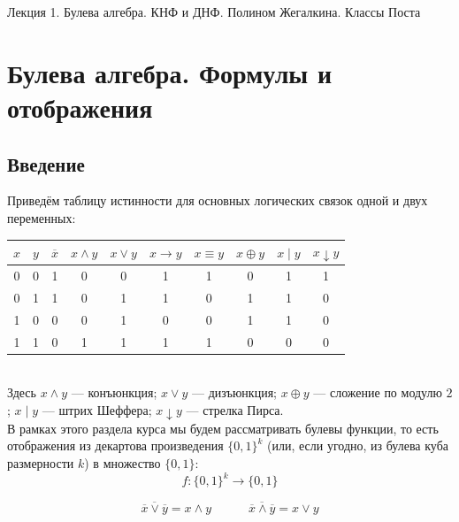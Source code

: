 \documentclass[11pt]{article}
\begin{document}
\begin{titlepage}
    \centering
    \vspace*{\fill}  %

    {\Huge Лекция 1. Булева алгебра. КНФ и ДНФ. Полином Жегалкина. Классы Поста
    \par}

    \vspace*{\fill}  %
\end{titlepage}

\setcounter{page}{1}

\section{Булева алгебра. Формулы и отображения}

\subsection{Введение}

Приведём таблицу истинности для основных логических связок одной и двух переменных:

\begin{center}
    \begin{tabular}{|c|c|c|c|c|c|c|c|c|c|}
    \hline
    $x$ & $y$ & $\overline{x}$ & $x \land y$ & $x \lor y$ & $x \to y$ & $x \equiv y$ & $x \oplus y$ & $x \mid y$ & $x \downarrow y$ \\
    \hline
    0 & 0 & 1 & 0 & 0 & 1 & 1 & 0 & 1 & 1 \\
    \hline
    0 & 1 & 1 & 0 & 1 & 1 & 0 & 1 & 1 & 0 \\
    \hline
    1 & 0 & 0 & 0 & 1 & 0 & 0 & 1 & 1 & 0 \\
    \hline
    1 & 1 & 0 & 1 & 1 & 1 & 1 & 0 & 0 & 0 \\
    \hline
\end{tabular}
\end{center} \leavevmode
\\
Здесь $x \land y$ --- конъюнкция; $x \lor y$ --- дизъюнкция; $x \oplus y$ --- сложение по модулю $2$; $x \mid y$ --- штрих Шеффера; $x \downarrow y$ --- стрелка Пирса.
\\
В рамках этого раздела курса мы будем рассматривать булевы функции, то есть отображения 
из декартова произведения $\{0, 1\}^k$ (или, если угодно, из булева куба размерности $k$) в множество $\{0, 1\}$:
\[f \colon \{0, 1\}^k \to \{0, 1\}\]

\begin{lemma}
    \begin{equation*}
        \overline{\overline{x} \lor \overline{y}} = x \land y
        \quad \quad \quad 
        \overline{\overline{x} \land \overline{y}} = x \lor y
    \end{equation*}
\end{lemma}
\end{document}
